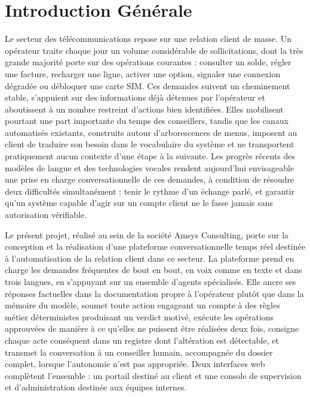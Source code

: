 \chapter*{Introduction Générale}

Le secteur des télécommunications repose sur une relation client de masse. Un opérateur traite chaque jour un volume considérable de sollicitations, dont la très grande majorité porte sur des opérations courantes : consulter un solde, régler une facture, recharger une ligne, activer une option, signaler une connexion dégradée ou débloquer une carte SIM. Ces demandes suivent un cheminement stable, s'appuient sur des informations déjà détenues par l'opérateur et aboutissent à un nombre restreint d'actions bien identifiées. Elles mobilisent pourtant une part importante du temps des conseillers, tandis que les canaux automatisés existants, construits autour d'arborescences de menus, imposent au client de traduire son besoin dans le vocabulaire du système et ne transportent pratiquement aucun contexte d'une étape à la suivante. Les progrès récents des modèles de langue et des technologies vocales rendent aujourd'hui envisageable une prise en charge conversationnelle de ces demandes, à condition de résoudre deux difficultés simultanément : tenir le rythme d'un échange parlé, et garantir qu'un système capable d'agir sur un compte client ne le fasse jamais sans autorisation vérifiable.

Le présent projet, réalisé au sein de la société Amsys Consulting, porte sur la conception et la réalisation d'une plateforme conversationnelle temps réel destinée à l'automatisation de la relation client dans ce secteur. La plateforme prend en charge les demandes fréquentes de bout en bout, en voix comme en texte et dans trois langues, en s'appuyant sur un ensemble d'agents spécialisés. Elle ancre ses réponses factuelles dans la documentation propre à l'opérateur plutôt que dans la mémoire du modèle, soumet toute action engageant un compte à des règles métier déterministes produisant un verdict motivé, exécute les opérations approuvées de manière à ce qu'elles ne puissent être réalisées deux fois, consigne chaque acte conséquent dans un registre dont l'altération est détectable, et transmet la conversation à un conseiller humain, accompagnée du dossier complet, lorsque l'autonomie n'est pas appropriée. Deux interfaces web complètent l'ensemble : un portail destiné au client et une console de supervision et d'administration destinée aux équipes internes.

